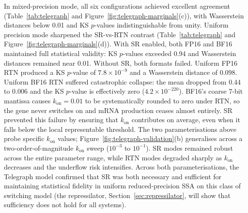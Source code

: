 \documentclass{article}
\begin{document}
In mixed-precision mode, all six configurations achieved excellent agreement (Table~\ref{tab:telegraph} and Figure~\ref{fig:telegraph-marginals}(c)), with Wasserstein distances below 0.01 and KS $p$-values indistinguishable from unity. Uniform precision mode sharpened the SR-vs-RTN contrast (Table~\ref{tab:telegraph} and Figure~\ref{fig:telegraph-marginals}(d)). With SR enabled, both FP16 and BF16 maintained full statistical validity: KS $p$-values exceeded 0.94 and Wasserstein distances remained near 0.01. Without SR, both formats failed. Uniform FP16 RTN produced a KS $p$-value of $7.8 \times 10^{-9}$ and a Wasserstein distance of 0.098. Uniform BF16 RTN suffered catastrophic collapse: the mean dropped from 0.44 to 0.006 and the KS $p$-value is effectively zero ($4.2 \times 10^{-220}$). BF16's coarse 7-bit mantissa causes $k_{\mathrm{on}} = 0.01$ to be systematically rounded to zero under RTN, so the gene never switches on and mRNA production ceases almost entirely. SR prevented this failure by ensuring that $k_{\mathrm{on}}$ contributes on average, even when it falls below the local representable threshold. The two parameterisations above probe specific $k_{\mathrm{on}}$ values; Figure~\ref{fig:telegraph-validation}(b) generalises across a two-order-of-magnitude $k_{\mathrm{on}}$ sweep ($10^{-3}$ to $10^{-1}$). SR modes remained robust across the entire parameter range, while RTN modes degraded sharply as $k_{\mathrm{on}}$ decreases and the underflow risk intensifies. Across both parameterisations, the Telegraph model confirmed that SR was both necessary and sufficient for maintaining statistical fidelity in uniform reduced-precision SSA on this class of switching model (the repressilator, Section~\ref{sec:repressilator}, will show that sufficiency does not hold for all systems).
\end{document}
